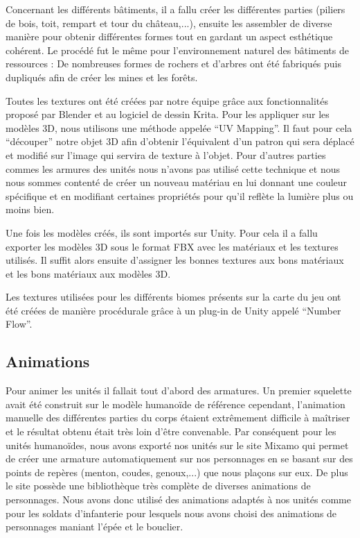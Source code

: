 \documentclass[12pt]{report}
\begin{document}
Concernant les différents bâtiments, il a fallu créer les différentes parties
(piliers de bois, toit, rempart et tour du château,...), ensuite les assembler
de diverse manière pour obtenir différentes formes tout en gardant un aspect
esthétique cohérent. Le procédé fut le même pour l’environnement naturel des
bâtiments de ressources : De nombreuses formes de rochers et d’arbres ont été
fabriqués puis dupliqués afin de créer les mines et les forêts.

Toutes les textures ont été créées par notre équipe grâce aux fonctionnalités
proposé par Blender et au logiciel de dessin Krita. Pour les appliquer sur les
modèles 3D, nous utilisons une méthode appelée “UV Mapping”. Il faut pour cela
“découper” notre objet 3D afin d’obtenir l’équivalent d’un patron qui sera
déplacé et modifié sur l’image qui servira de texture à l’objet. Pour d’autres
parties commes les armures des unités nous n’avons pas utilisé cette technique
et nous nous sommes contenté de créer un nouveau matériau en lui donnant une
couleur spécifique et en modifiant certaines propriétés pour qu’il reflète la
lumière plus ou moins bien.

Une fois les modèles créés, ils sont importés sur Unity. Pour cela il a fallu
exporter les modèles 3D sous le format FBX avec les matériaux et les textures
utilisés. Il suffit alors ensuite d’assigner les bonnes textures aux bons
matériaux et les bons matériaux aux modèles 3D.

Les textures utilisées pour les différents biomes présents sur la carte du jeu
ont été créées de manière procédurale grâce à un plug-in de Unity appelé “Number
Flow”.

\subsection{Animations}

Pour animer les unités il fallait tout d’abord des armatures. Un premier
squelette avait été construit sur le modèle humanoïde de référence cependant,
l’animation manuelle des différentes parties du corps étaient extrêmement
difficile à maîtriser et le résultat obtenu était très loin d’être convenable.
Par conséquent pour les unités humanoïdes, nous avons exporté nos unités sur le
site Mixamo qui permet de créer une armature automatiquement sur nos personnages
en se basant sur des points de repères (menton, coudes, genoux,...) que nous
plaçons sur eux. De plus le site possède une bibliothèque très complète de
diverses animations de personnages. Nous avons donc utilisé des animations
adaptés à nos unités comme pour les soldats d’infanterie pour lesquels nous
avons choisi des animations de personnages maniant l’épée et le bouclier.
\end{document}
